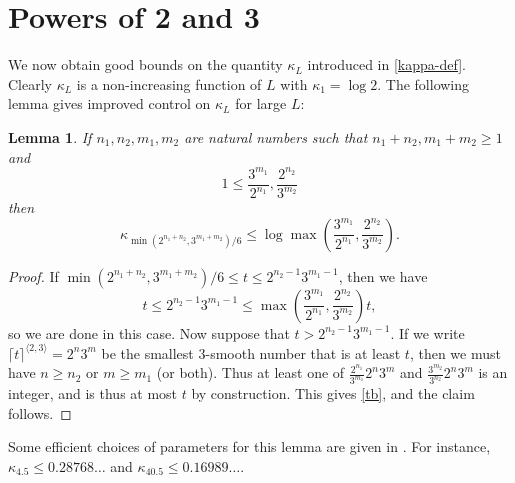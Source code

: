 \documentclass[12pt,a4paper,reqno]{amsart}
\numberwithin{equation}{section}
\theoremstyle{plain}
\newtheorem{lemma}[theorem]{Lemma}
\theoremstyle{definition}
\begin{document}
\section{Powers of 2 and 3}\label{power-sec}

We now obtain good bounds on the quantity $\kappa_L$ introduced in \eqref{kappa-def}.  Clearly $\kappa_L$ is a non-increasing function of $L$ with $\kappa_1 = \log 2$.  The following lemma gives improved control on $\kappa_L$ for large $L$:

\begin{lemma}\label{lemcount-0}  If $n_1,n_2,m_1,m_2$ are natural numbers such that $n_1+n_2, m_1+m_2 \geq 1$ and
$$ 1 \leq \frac{3^{m_1}}{2^{n_1}}, \frac{2^{n_2}}{3^{m_2}}$$
then
$$ \kappa_{\min( 2^{n_1+n_2},3^{m_1+m_2})/6} \leq \log \max\left(\frac{3^{m_1}}{2^{n_1}}, \frac{2^{n_2}}{3^{m_2}}\right).$$
\end{lemma}

\begin{proof}  If $\min( 2^{n_1+n_2},3^{m_1+m_2})/6 \leq t \leq 2^{n_2-1} 3^{m_1-1}$, then we have
\begin{equation}\label{tb} 
  t \leq 2^{n_2-1} 3^{m_1-1} \leq \max\left(\frac{3^{m_1}}{2^{n_1}}, \frac{2^{n_2}}{3^{m_2}}\right) t,
\end{equation}
so we are done in this case.  Now suppose that $t > 2^{n_2-1} 3^{m_1-1}$.
If we write $\lceil t \rceil^{\langle 2,3 \rangle} =2^n 3^m$ be the smallest $3$-smooth number that is at least $t$, then we must have $n \geq n_2$ or $m \geq m_1$ (or both).  Thus at least one of $\frac{2^{n_1}}{3^{m_1}} 2^n 3^m$ and $\frac{3^{m_2}}{3^{n_2}} 2^n 3^m$ is an integer, and is thus at most $t$ by construction.  This gives \eqref{tb}, and the claim follows.
\end{proof}

Some efficient choices of parameters for this lemma are given in .  For instance, $\kappa_{4.5} \leq 0.28768\dots$ and $\kappa_{40.5} \leq 0.16989\dots$.
\end{document}
